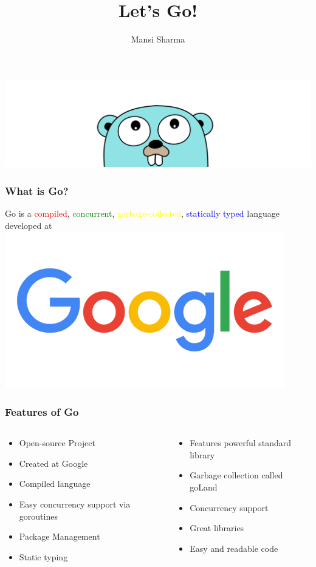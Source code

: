 \documentclass[14pt]{beamer}
\title[A Tour of Go]{\huge Let's Go!}
\author{Mansi Sharma}
\begin{document}
{
\begin{frame}
    \titlepage
    \includegraphics[width=\linewidth]{img/golang.png}
\end{frame}
}

{
\begin{frame}
    \frametitle {What is Go?}
    \begin{center}
        \textcolor{deepblue}{Go is a \textcolor{red}{compiled}, \textcolor{green}{concurrent}, \textcolor{yellow}{garbage-collected}, \textcolor{blue}{statically typed} language developed at}
        \linebreak
        \includegraphics[width=0.3\linewidth]{img/google.png}
    \end{center}
\end{frame}
}

{
\begin{frame}
    \frametitle{Features of Go}
    \begin{columns}
        \begin{column}{0.5\textwidth}
            \begin{itemize}
                \item Open-source Project
                \item Created at Google
                \item Compiled language
                \item Easy concurrency support via goroutines
                \item Package Management
                \item Static typing
            \end{itemize}
        \end{column}
        \begin{column}{0.5\textwidth}
            \begin{itemize}
                \item Features powerful standard library
                \item Garbage collection called goLand
                \item Concurrency support
                \item Great libraries
                \item Easy and readable code
            \end{itemize}
        \end{column}
    \end{columns}
\end{frame}
}
\end{document}
